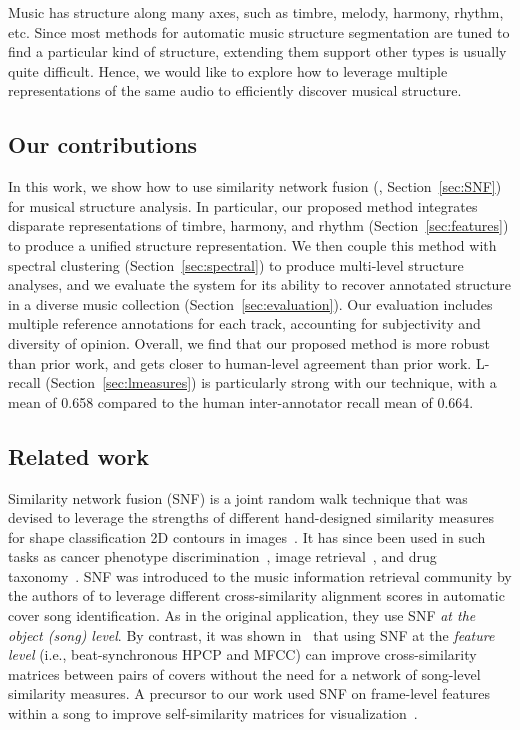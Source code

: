 \documentclass{article}
\begin{document}
Music has structure along many axes, such as timbre, melody, harmony, rhythm, etc.  Since most methods for automatic music structure segmentation are tuned to find a particular kind of structure, extending them support other types is usually quite difficult.  Hence, we would like to explore how to leverage multiple representations of the same audio to efficiently discover musical structure.

\subsection{Our contributions}

In this work, we show how to use similarity network fusion (\cite{wang2012unsupervised,wang2014similarity}, Section~\ref{sec:SNF}) for musical structure analysis.  In particular, our proposed method integrates disparate representations of timbre, harmony, and rhythm (Section~\ref{sec:features}) to produce a unified structure representation.  We then couple this method with spectral clustering (Section~\ref{sec:spectral}) to produce multi-level structure analyses, and we evaluate the system for its ability to recover annotated structure in a diverse music collection (Section~\ref{sec:evaluation}).  Our evaluation includes multiple reference annotations for each track, accounting for subjectivity and diversity of opinion. Overall, we find that our proposed method is more robust than prior work, and gets closer to human-level agreement than prior work.  L-recall (Section~\ref{sec:lmeasures}) is particularly strong with our technique, with a mean of 0.658 compared to the human inter-annotator recall mean of 0.664.



\subsection{Related work}

Similarity network fusion (SNF) is a joint random walk technique that was devised to leverage the strengths of different hand-designed similarity measures for shape classification 2D contours in images~\cite{wang2012unsupervised}.  It has since been used in such tasks as cancer phenotype discrimination~\cite{wang2014similarity}, image retrieval~\cite{chen2018ci}, and drug taxonomy~\cite{chen2018ci}.  SNF was introduced to the music information retrieval community by the authors of \cite{Chen2017CSFusion} to leverage different cross-similarity alignment scores in automatic cover song identification.  As in the original application, they use SNF {\em at the object (song) level}.  By contrast, it was shown in~\cite{tralie2017cover} that using SNF at the {\em feature level} (i.e., beat-synchronous HPCP and MFCC) can improve cross-similarity matrices between pairs of covers without the need for a network of song-level similarity measures.  A precursor to our work used SNF on frame-level features within a song to improve self-similarity matrices for visualization~\cite{tralie2018graphditty}.
\end{document}
